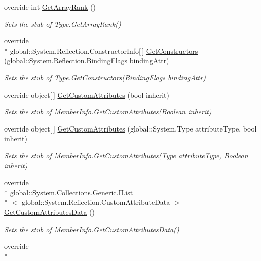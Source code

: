 \begin{DoxyCompactItemize}
override int \hyperlink{class_system_1_1_fakes_1_1_stub_type_a9b472d2a614259aaa0095528a5461cd7}{Get\-Array\-Rank} ()
\begin{DoxyCompactList}\small\item\em Sets the stub of Type.\-Get\-Array\-Rank()\end{DoxyCompactList}\item 
override \\*
global\-::\-System.\-Reflection.\-Constructor\-Info\mbox{[}$\,$\mbox{]} \hyperlink{class_system_1_1_fakes_1_1_stub_type_a715ba8b4c40fc0d38d1ae380a4ac5492}{Get\-Constructors} (global\-::\-System.\-Reflection.\-Binding\-Flags binding\-Attr)
\begin{DoxyCompactList}\small\item\em Sets the stub of Type.\-Get\-Constructors(\-Binding\-Flags binding\-Attr)\end{DoxyCompactList}\item 
override object\mbox{[}$\,$\mbox{]} \hyperlink{class_system_1_1_fakes_1_1_stub_type_af6e62132edd222696b7ecb13467126bb}{Get\-Custom\-Attributes} (bool inherit)
\begin{DoxyCompactList}\small\item\em Sets the stub of Member\-Info.\-Get\-Custom\-Attributes(\-Boolean inherit)\end{DoxyCompactList}\item 
override object\mbox{[}$\,$\mbox{]} \hyperlink{class_system_1_1_fakes_1_1_stub_type_aab4d2dfe8297d259cc95a6175e7c9707}{Get\-Custom\-Attributes} (global\-::\-System.\-Type attribute\-Type, bool inherit)
\begin{DoxyCompactList}\small\item\em Sets the stub of Member\-Info.\-Get\-Custom\-Attributes(\-Type attribute\-Type, Boolean inherit)\end{DoxyCompactList}\item 
override \\*
global\-::\-System.\-Collections.\-Generic.\-I\-List\\*
$<$ global\-::\-System.\-Reflection.\-Custom\-Attribute\-Data $>$ \hyperlink{class_system_1_1_fakes_1_1_stub_type_aafdf43f0c33520f33edcf68e2c82abf4}{Get\-Custom\-Attributes\-Data} ()
\begin{DoxyCompactList}\small\item\em Sets the stub of Member\-Info.\-Get\-Custom\-Attributes\-Data()\end{DoxyCompactList}\item 
override \\*

\end{DoxyCompactItemize}
